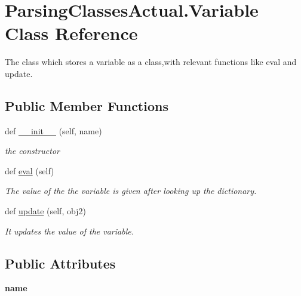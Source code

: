 \hypertarget{class_parsing_classes_actual_1_1_variable}{}\section{Parsing\+Classes\+Actual.\+Variable Class Reference}
\label{class_parsing_classes_actual_1_1_variable}


The class which stores a variable as a class,with relevant functions like eval and update.  


\subsection*{Public Member Functions}
\begin{DoxyCompactItemize}
\item 
def \hyperlink{class_parsing_classes_actual_1_1_variable_a1e45d0c6cdb70b7f36a432914a530364}{\+\_\+\+\_\+init\+\_\+\+\_\+} (self, name)
\begin{DoxyCompactList}\small\item\em the constructor \end{DoxyCompactList}\item 
def \hyperlink{class_parsing_classes_actual_1_1_variable_ad10453c7fa8c6067a3e20ca7b15a9b0e}{eval} (self)\hypertarget{class_parsing_classes_actual_1_1_variable_ad10453c7fa8c6067a3e20ca7b15a9b0e}{}\label{class_parsing_classes_actual_1_1_variable_ad10453c7fa8c6067a3e20ca7b15a9b0e}

\begin{DoxyCompactList}\small\item\em The value of the the variable is given after looking up the dictionary. \end{DoxyCompactList}\item 
def \hyperlink{class_parsing_classes_actual_1_1_variable_ac3a39c7351d2b51b097903733af3f7ec}{update} (self, obj2)
\begin{DoxyCompactList}\small\item\em It updates the value of the variable. \end{DoxyCompactList}\end{DoxyCompactItemize}
\subsection*{Public Attributes}
\begin{DoxyCompactItemize}
\item 
{\bfseries name}\hypertarget{class_parsing_classes_actual_1_1_variable_ada0de9ca99f5a48b167a472f2f03d100}{}\label{class_parsing_classes_actual_1_1_variable_ada0de9ca99f5a48b167a472f2f03d100}

\end{DoxyCompactItemize}



